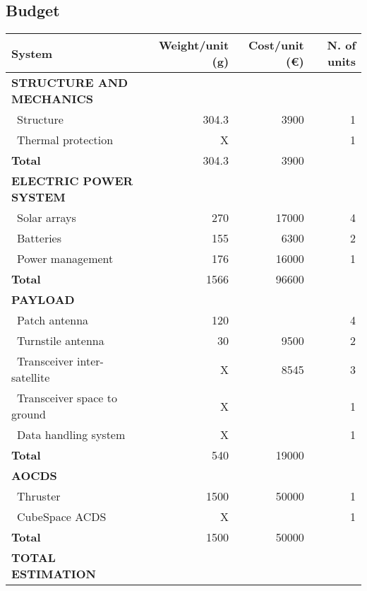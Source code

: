 
\subsection{Budget}

\begin{longtable}{| l | r | r | r |}
\rowcolor[gray]{0.80}	\textbf{System} & \textbf{Weight/unit (g)} & \textbf{Cost/unit (\euro)} & \textbf{N. of units}\\
    \hline
    \endfirsthead


\rowcolor[gray]{0.85} \textbf{STRUCTURE AND MECHANICS} & & & \\

   ~Structure & 304.3 & 3900 & 1 \\
   ~Thermal protection & X & & 1\\
   \hline
   \rowcolor[gray]{0.95} \textbf{Total} & 304.3 & 3900 &  \\
   \hline
   
\rowcolor[gray]{0.85} \textbf{ELECTRIC POWER SYSTEM} & & & \\

   ~Solar arrays & 270 & 17000 & 4 \\
   ~Batteries & 155 & 6300 & 2 \\
   ~Power management & 176 & 16000 & 1 \\
   \hline
   \rowcolor[gray]{0.95} \textbf{Total} & 1566 & 96600 &  \\
   \hline

\rowcolor[gray]{0.85} \textbf{PAYLOAD} & & & \\

   ~Patch antenna & 120 & & 4 \\
   ~Turnstile antenna & 30 & 9500 & 2 \\
   ~Transceiver inter-satellite & X & 8545 & 3 \\
   ~Transceiver space to ground & X & & 1 \\
   ~Data handling system & X & & 1\\
   \hline
   \rowcolor[gray]{0.95} \textbf{Total} & 540 & 19000 & \\
   \hline
   
\rowcolor[gray]{0.85} \textbf{AOCDS} & & &\\

   ~Thruster & 1500 & 50000 & 1 \\
   ~CubeSpace ACDS & X & & 1 \\
   \hline
   \rowcolor[gray]{0.95} \textbf{Total} & 1500 & 50000 & \\
   \hline
   
\rowcolor[gray]{0.9} \textbf{TOTAL ESTIMATION} & & & \\


\end{longtable} 
